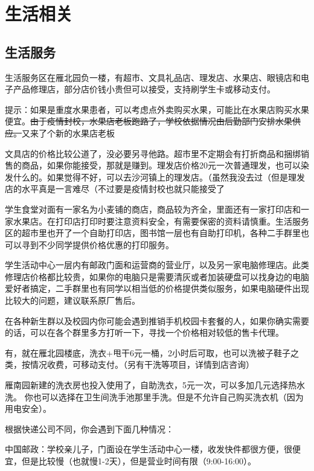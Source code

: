 \section{生活相关}

\subsection{生活服务}


生活服务区在雁北园负一楼，有超市、文具礼品店、理发店、水果店、眼镜店和电子产品修理店，部分店价钱小贵但可以接受，支持刷学生卡或移动支付。

提示：如果是重度水果患者，可以考虑点外卖购买水果，可能比在水果店购买水果便宜。\sout{由于疫情封校，水果店老板跑路了，学校依据情况由后勤部门安排水果供应。}又来了个新的水果店老板

文具店的价格比较公道了，没必要另寻他路。超市里不定期会有打折商品和捆绑销售的商品，如果你能接受，那就是赚到。理发店价格20元一次普通理发，也可以染发什么的。如果觉得不好，可以去沙河镇上的理发店。（虽然我没去过（但是理发店的水平真是一言难尽（不过要是疫情封校也就只能接受了

学生食堂对面有一家名为小麦铺的商店，商品较为齐全，里面还有一家打印店和一家水果店。在打印店打印时要注意资料安全，有需要保密的资料请慎重。生活服务区的超市里也开了一个自助打印店，图书馆一层也有自助打印机，各种二手群里也可以寻到不少同学提供价格优惠的打印服务。

学生活动中心一层内有邮政门面和运营商的营业厅，以及另一家电脑修理店。此类修理店价格都比较贵，如果你的电脑只是需要清灰或者加装硬盘可以找身边的电脑爱好者搞定，二手群里也有同学以相当低的价格提供类似服务，如果电脑硬件出现比较大的问题，建议联系原厂售后。

在各种新生群以及校园内你可能会遇到推销手机校园卡套餐的人，如果你确实需要的话，可以在各个群里多方打听一下，寻找一个价格相对较低的售卡代理。


有，就在雁北园楼底，洗衣+甩干6元一桶，2小时后可取，也可以洗被子鞋子之类，按情况收费，可移动支付。（另有干洗等项目，详情到店咨询）

雁南园新建的洗衣房也投入使用了，自助洗衣，5元一次，可以多加几元选择热水洗。
你也可以选择在卫生间洗手池那里手洗。但是不允许自己购买洗衣机（因为用电安全）。


根据快递公司不同，你会遇到下面几种情况：

中国邮政：学校亲儿子，门面设在学生活动中心一楼，收发快件都很方便，很便宜，但是比较慢（也就慢1-2天），但是营业时间有限（9:00-16:00）。

